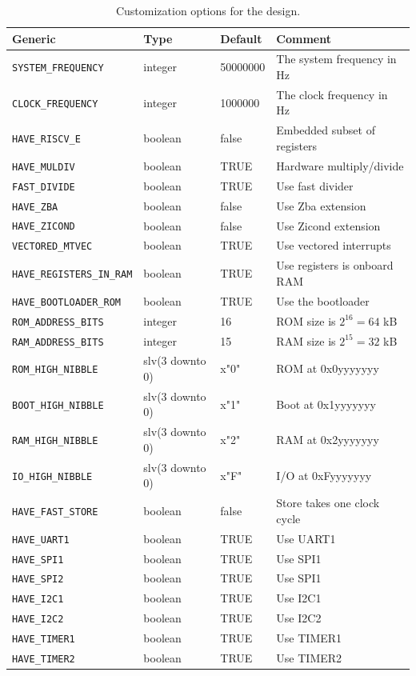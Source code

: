 \documentclass[12pt]{article}
\begin{document}
\begin{table}[!ht]
\caption{Customization options for the design.}
\label{tab:custom}
\centering
\begin{tabular}{llll}
\toprule
Generic & Type & Default & Comment \\
\midrule
\lstinline|SYSTEM_FREQUENCY| & integer & 50000000 & The system frequency in Hz \\
\lstinline|CLOCK_FREQUENCY| & integer & 1000000 & The clock frequency in Hz \\
\lstinline|HAVE_RISCV_E| & boolean & false & Embedded subset of registers\\
\lstinline|HAVE_MULDIV| & boolean & TRUE &  Hardware multiply/divide \\
\lstinline|FAST_DIVIDE| & boolean & TRUE & Use fast divider\\
\lstinline|HAVE_ZBA| & boolean & false & Use Zba extension \\
\lstinline|HAVE_ZICOND| & boolean & false & Use Zicond extension \\
\lstinline|VECTORED_MTVEC| & boolean & TRUE & Use vectored interrupts\\
\lstinline|HAVE_REGISTERS_IN_RAM| & boolean & TRUE & Use registers is onboard RAM\\
\lstinline|HAVE_BOOTLOADER_ROM| & boolean & TRUE & Use the bootloader\\
\lstinline|ROM_ADDRESS_BITS| & integer & 16 & ROM size is $2^{16} = 64$ kB \\
\lstinline|RAM_ADDRESS_BITS| & integer & 15 & RAM size is $2^{15} = 32$ kB \\
\lstinline|ROM_HIGH_NIBBLE| & slv(3 downto 0) & x"0" & ROM at 0x0yyyyyyy\\
\lstinline|BOOT_HIGH_NIBBLE| & slv(3 downto 0) & x"1" & Boot at 0x1yyyyyyy\\
\lstinline|RAM_HIGH_NIBBLE| & slv(3 downto 0) & x"2" & RAM at 0x2yyyyyyy\\
\lstinline|IO_HIGH_NIBBLE| & slv(3 downto 0) & x"F" & I/O at 0xFyyyyyyy\\
\lstinline|HAVE_FAST_STORE| & boolean & false & Store takes one clock cycle \\
\lstinline|HAVE_UART1| & boolean & TRUE & Use UART1 \\
\lstinline|HAVE_SPI1| & boolean & TRUE & Use SPI1 \\
\lstinline|HAVE_SPI2| & boolean & TRUE & Use SPI1 \\
\lstinline|HAVE_I2C1| & boolean & TRUE & Use I2C1 \\
\lstinline|HAVE_I2C2| & boolean & TRUE & Use I2C2 \\
\lstinline|HAVE_TIMER1| & boolean & TRUE & Use TIMER1\\
\lstinline|HAVE_TIMER2| & boolean & TRUE & Use TIMER2\\
\bottomrule
\end{tabular}
\end{table}
\end{document}
